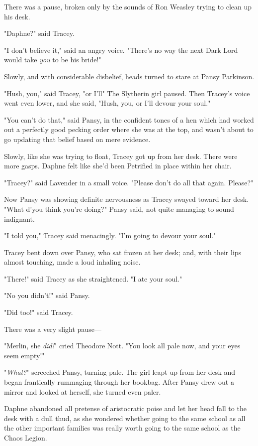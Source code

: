 There was a pause, broken only by the sounds of Ron Weasley trying to clean up
his desk.

"Daphne?" said Tracey.

"I don't believe it," said an angry voice. "There's no way the next Dark Lord
would take \emph{you} to be his bride!"

Slowly, and with considerable disbelief, heads turned to stare at Pansy
Parkinson.

"Hush, you," said Tracey, "or I'll{\el}" The Slytherin girl paused. Then
Tracey's voice went even lower, and she said, "Hush, you, or I'll devour your
soul."

"You can't do that," said Pansy, in the confident tones of a hen which had
worked out a perfectly good pecking order where she was at the top, and wasn't
about to go updating that belief based on mere evidence.

Slowly, like she was trying to float, Tracey got up from her desk. There were
more gasps. Daphne felt like she'd been Petrified in place within her chair.

"Tracey?" said Lavender in a small voice. "Please don't do all that again.
Please?"

Now Pansy was showing definite nervousness as Tracey swayed toward her desk.
"What d'you think you're doing?" Pansy said, not quite managing to sound
indignant.

"I told you," Tracey said menacingly. "I'm going to devour your soul."

Tracey bent down over Pansy, who sat frozen at her desk; and, with their lips
almost touching, made a loud inhaling noise.

"There!" said Tracey as she straightened. "I ate your soul."

"No you didn't!" said Pansy.

"Did too!" said Tracey.

There was a very slight pause---

"Merlin, she \emph{did!}" cried Theodore Nott. "You look all pale now, and your
eyes seem empty!"

"\emph{What?}" screeched Pansy, turning pale. The girl leapt up from her desk
and began frantically rummaging through her bookbag. After Pansy drew out a
mirror and looked at herself, she turned even paler.

Daphne abandoned all pretense of aristocratic poise and let her head fall to
the desk with a dull thud, as she wondered whether going to the same school as
all the other important families was really worth going to the same school as
the Chaos Legion.

